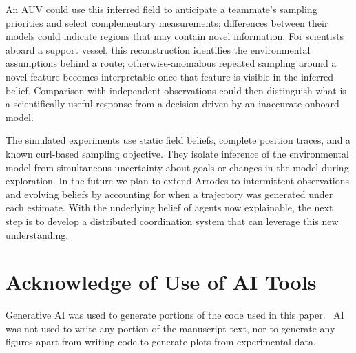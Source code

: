 \documentclass[letterpaper,10pt,conference]{ieeeconf}
\begin{document}
An AUV could use this inferred field to anticipate a teammate's sampling priorities and select complementary measurements; differences between their models could indicate regions that may contain novel information. For scientists aboard a support vessel, this reconstruction identifies the environmental assumptions behind a route; otherwise-anomalous repeated sampling around a novel feature becomes interpretable once that feature is visible in the inferred belief. Comparison with independent observations could then distinguish what is a scientifically useful response from a decision driven by an inaccurate onboard model.

The simulated experiments use static field beliefs, complete position traces, and a known curl-based sampling objective. They isolate inference of the environmental model from simultaneous uncertainty about goals or changes in the model during exploration. In the future we plan to extend Arrodes to intermittent observations and evolving beliefs by accounting for when a trajectory was generated under each estimate. With the underlying belief of agents now explainable, the next step is to develop a distributed coordination system that can leverage this new understanding.

\section*{Acknowledge of Use of AI Tools}

Generative AI was used to generate portions of the code used in this paper.  AI was not used to write any portion of the manuscript text, nor to generate any figures apart from writing code to generate plots from experimental data.

\balance



\end{document}
